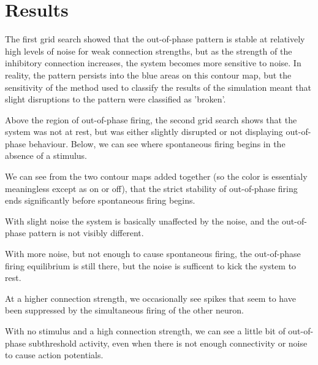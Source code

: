 \documentclass{article}
\begin{document}
\section*{Results}
The first grid search showed that the out-of-phase pattern is stable at relatively high levels
of noise for weak connection strengths, but as the strength of the inhibitory connection increases,
the system becomes more sensitive to noise.  In reality, the pattern persists into the blue areas
on this contour map, but the sensitivity of the method used to classify the results of the simulation
meant that slight disruptions to the pattern were classified as 'broken'.\\
\scalebox{0.6}{}

Above the region of out-of-phase firing, the second grid search shows that the system was not at rest,
but was either slightly disrupted or not displaying out-of-phase behaviour.  Below, we can see where
spontaneous firing begins in the absence of a stimulus.\\
\scalebox{0.6}{}

We can see from the two contour maps added together (so the color is essentialy meaningless except
as on or off), that the strict stability of out-of-phase firing ends significantly before spontaneous 
firing begins.\\
\scalebox{0.55}{}

With slight noise the system is basically unaffected by the noise, and the out-of-phase pattern
is not visibly different.\\
\scalebox{0.6}{}

With more noise, but not enough to cause spontaneous firing, the out-of-phase firing equilibrium
is still there, but the noise is sufficent to kick the system to rest. \\
\scalebox{0.55}{}

At a higher connection strength, we occasionally see spikes that seem to have been suppressed by
the simultaneous firing of the other neuron.\\
\scalebox{0.6}{}

With no stimulus and a high connection strength, we can see a little bit of out-of-phase subthreshold
activity, even when there is not enough connectivity or noise to cause action potentials.\\
\scalebox{0.6}{}
\end{document}

